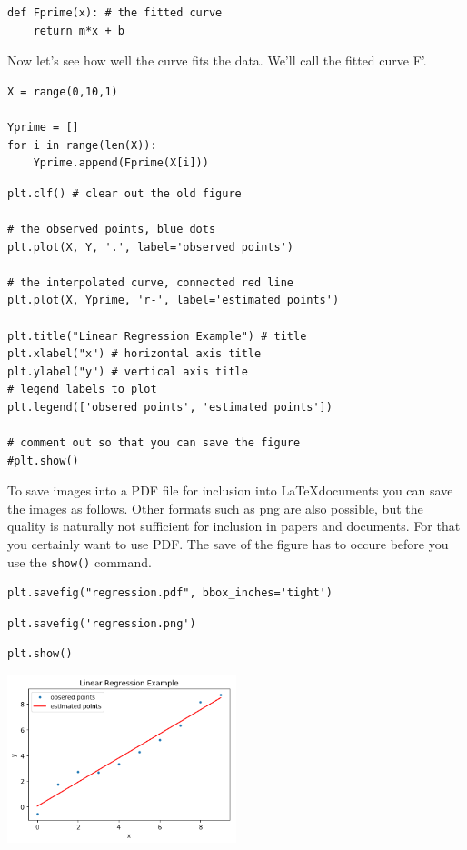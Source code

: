 \begin{verbatim}
def Fprime(x): # the fitted curve
    return m*x + b
\end{verbatim}

Now let's see how well the curve fits the data. We'll call the fitted
curve F'.

\begin{verbatim}
X = range(0,10,1)

Yprime = []
for i in range(len(X)):
    Yprime.append(Fprime(X[i]))
\end{verbatim}

\begin{verbatim}
plt.clf() # clear out the old figure

# the observed points, blue dots
plt.plot(X, Y, '.', label='observed points') 

# the interpolated curve, connected red line
plt.plot(X, Yprime, 'r-', label='estimated points')  

plt.title("Linear Regression Example") # title
plt.xlabel("x") # horizontal axis title
plt.ylabel("y") # vertical axis title
# legend labels to plot
plt.legend(['obsered points', 'estimated points']) 

# comment out so that you can save the figure
#plt.show()
\end{verbatim}

To save images into a PDF file for inclusion into \LaTeX documents you
can save the images as follows. Other formats such as png are also
possible, but the quality is naturally not sufficient for inclusion in
papers and documents. For that you certainly want to use PDF. The save
of the figure has to occure before you use the \verb|show()| command.

\begin{verbatim}
plt.savefig("regression.pdf", bbox_inches='tight')
\end{verbatim}

\begin{verbatim}
plt.savefig('regression.png') 
\end{verbatim}

\begin{verbatim}
plt.show()
\end{verbatim}

\begin{center}
\includegraphics[width=0.5\textwidth]{scipy/output_40_0.png}
\end{center}


